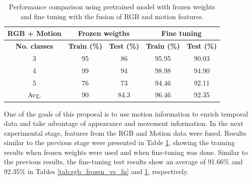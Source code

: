 \documentclass[mathematics,article,submit,pdftex,moreauthors]{Definitions/mdpi}
\begin{document}
\begin{table}[ht!]
\centering
\caption{Performance comparison using pretrained model with frozen weights and fine tuning with the fusion of RGB and motion features. \label{tab:motion_frozen_vs_fn}}
\begin{tabular}{c|cc|cc}
\textbf{RGB + Motion}& \multicolumn{2}{c|}{\textbf{Frozen weigths}} & \multicolumn{2}{c}{\textbf{Fine tuning}} \\ \hline
\textbf{No. classes} & \textbf{Train (\%)}        & \textbf{Test (\%)}        & \textbf{Train (\%)}       & \textbf{Test (\%)}      \\ \hline
3                    &  95                   & 86                   &  95.95               &  90.03             \\
4                    &  99                   & 94                   &  98.98               &  94.90             \\
5                    &  76                   & 73                   &  94.46               &  92.11             \\ \hline
Avg.                 &  90                 & 84.3               &  96.46               &  92.35
\end{tabular}
\end{table}

One of the goals of this proposal is to use motion information to enrich temporal data and take advantage of appearance and movement information. In the next experimental stage, features from the RGB and Motion data were fused. Results similar to the previous stage were presented in Table \ref{tab:motion_frozen_vs_fn}, showing the training results when frozen weights were used and when fine-tuning was done. Similar to the previous results, the fine-tuning test results show an average of 91.66\% and 92.35\% in Tables \ref{tab:rgb_frozen_vs_fn} and \ref{tab:motion_frozen_vs_fn}, respectively. 
\end{document}
